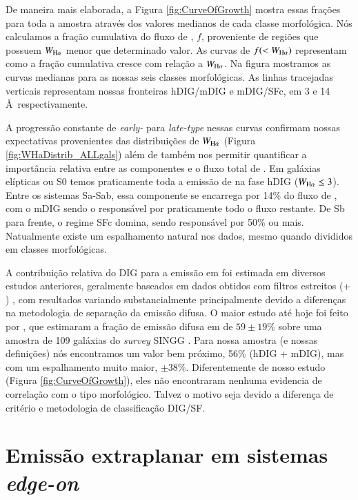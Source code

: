 De maneira mais elaborada, a Figura \ref{fig:CurveOfGrowth} mostra essas frações para toda a amostra através dos valores medianos de cada classe morfológica. Nós calculamos a fração cumulativa do fluxo de \Ha, $f$, proveniente de regiões que possuem $W_{\Ha}$ menor que determinado valor. As curvas de $f(<W_{\Ha})$ representam como a fração cumulativa cresce com relação a $W_{\Ha}$. Na figura mostramos as curvas medianas para as nossas seis classes morfológicas. As linhas tracejadas verticais representam nossas fronteiras hDIG/mDIG e mDIG/SFc, em 3 e 14 \AA\ respectivamente.

A progressão constante de {\em early-} para {\em late-type} nessas curvas confirmam nossas expectativas provenientes das distribuições de $W_{\Ha}$ (Figura \ref{fig:WHaDistrib_ALLgals}) além de também nos permitir quantificar a importância relativa entre as componentes e o fluxo total de \Ha. Em galáxias elípticas ou S0 temos praticamente toda a emissão de \Ha na fase hDIG ($W_{\Ha} \le 3$). Entre os sistemas Sa-Sab, essa componente se encarrega por 14\% do fluxo de \Ha, com o mDIG sendo o responsável por praticamente todo o fluxo restante. De Sb para frente, o regime SFc domina, sendo responsável por 50\% ou mais. Natualmente existe um espalhamento natural nos dados, mesmo quando divididos em classes morfológicas.

A contribuição relativa do DIG para a emissão em \Ha foi estimada em diversos estudos anteriores, geralmente baseados em dados obtidos com filtros estreitos (\Ha + \nii) \citep{Ferguson.etal.1996, Zurita.etal.2000, Thilker.etal.2002, Oey.etal.2007}, com resultados variando substancialmente principalmente devido a diferenças na metodologia de separação da emissão difusa. O maior estudo até hoje foi feito por \citet{Oey.etal.2007}, que estimaram a fração de emissão difusa em \Ha de $59\pm19 \%$ sobre uma amostra de 109 galáxias do {\em survey} SINGG \citep{Meurer.etal.2006}. Para nossa amostra (e nossas definições) nós encontramos um valor bem próximo, 56\% (hDIG + mDIG), mas com um espalhamento muito maior, $\pm38 \%$. Diferentemente de nosso estudo (Figura \ref{fig:CurveOfGrowth}), eles não encontraram nenhuma evidencia de correlação com o tipo morfológico. Talvez o motivo seja devido a diferença de critério e metodologia de classificação DIG/SF.


\section{Emissão extraplanar em sistemas {\em edge-on}}
\label{sec:DIGdisc:edgeon}

